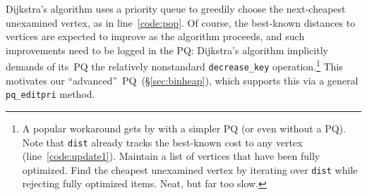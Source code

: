 Dijkstra's algorithm uses a priority queue to greedily choose the 
next-cheapest unexamined vertex, as in line~\ref{code:pop}. Of course, the 
best-known distances to vertices are expected to improve as the algorithm
proceeds, and such improvements need to be logged in the PQ:
Dijkstra's algorithm implicitly demands of its~PQ the relatively 
nonstandard \texttt{decrease\_key} operation.\footnote{A popular \cite{blah, blah, blah} 
workaround gets by with a simpler PQ (or even without a PQ).  
Note that \texttt{dist} already tracks the best-known cost 
to any vertex (line~\ref{code:update1}). Maintain a list of  
vertices that have been fully optimized. 
Find the cheapest unexamined vertex by 
iterating over \texttt{dist} while rejecting fully optimized items. 
Neat, but far too slow.}
This motivates our ``advanced''~PQ~(\S\ref{sec:binheap}),
which supports this via a general \texttt{pq\_editpri} method.


